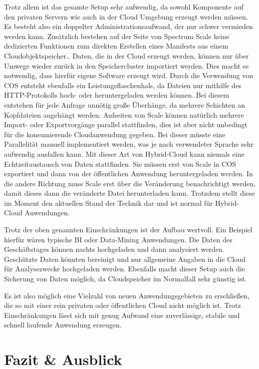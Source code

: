 Trotz allem ist das gesamte Setup sehr aufwendig, da sowohl Komponente auf den privaten Servern wie auch in der Cloud Umgebung erzeugt werden müssen. Es besteht also ein doppelter Administrationsaufwand, der nur schwer vermieden werden kann. 
Zusätzlich bestehen auf der Seite von Spectrum Scale keine dedizierten Funktionen zum direkten Erstellen eines Manifests aus einem Cloudobjektspeicher.. Daten, die in der Cloud erzeugt werden, können nur über Umwege wieder zurück in den Speichercluster importiert werden. Dies macht es notwendig, dass hierfür eigene Software erzeugt wird.
Durch die Verwendung von \ac{COS} entsteht ebenfalls ein Leistungsflaschenhals, da Dateien nur mithilfe des HTTP-Protokolls hoch- oder heruntergeladen werden können. Bei diesem entstehen für jede Anfrage unnötig große Überhänge, da mehrere Schichten an Kopfdateien angehängt werden. Aufseiten von Scale können natürlich mehrere Import- oder Exportvorgänge parallel stattfinden, dies ist aber nicht unbedingt für die konsumierende Cloudanwendung gegeben. Bei dieser müsste eine Parallelität manuell implementiert werden, was je nach verwendeter Sprache sehr aufwendig ausfallen kann.
Mit dieser Art von Hybrid-Cloud kann niemals eine Echtzeitaustausch von Daten stattfinden. Sie müssen erst von Scale in \ac{COS} exportiert und dann von der öffentlichen Anwendung heruntergeladen werden. In die andere Richtung muss Scale erst über die Veränderung benachrichtigt werden, damit dieses dann die veränderte Datei herunterladen kann. Trotzdem stellt diese im Moment den aktuellen Stand der Technik dar und ist normal für Hybrid-Cloud Anwendungen.

Trotz der oben genannten Einschränkungen ist der Aufbau wertvoll. Ein Beispiel hierfür wären typische \ac{BI} oder Data-Mining Anwendungen. Die Daten des Geschäftstages können nachts hochgeladen und dann analysiert werden.
Geschützte Daten könnten bereinigt und nur allgemeine Angaben in die Cloud für Analysezwecke hochgeladen werden.
Ebenfalls macht dieser Setup auch die Sicherung von Daten möglich, da Cloudspeicher im Normalfall sehr günstig ist.

Es ist also möglich eine Vielzahl von neuen Anwendungsgebieten zu erschließen, die so mit einer rein privaten oder öffentlichen Cloud nicht möglich ist. Trotz Einschränkungen lässt sich mit genug Aufwand eine zuverlässige, stabile und schnell laufende Anwendung erzeugen. 
\section{Fazit \& Ausblick}

